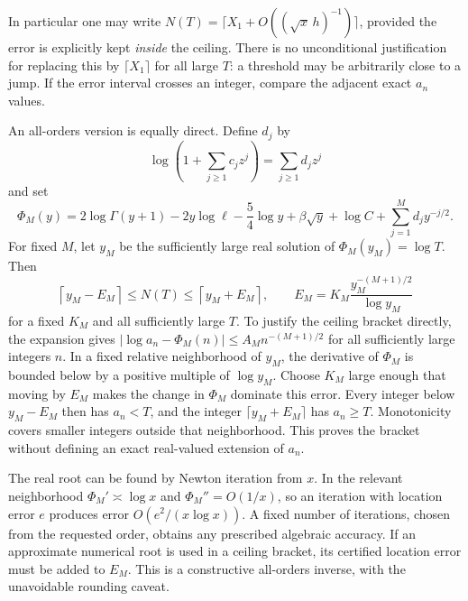 \documentclass[11pt]{article}
\theoremstyle{remark}\newtheorem{remark}{Remark}
\begin{document}
In particular one may write $N(T)=\lceil X_1+O((\sqrt x\,h)^{-1})\rceil$, provided the error is explicitly kept \emph{inside} the ceiling. There is no unconditional justification for replacing this by $\lceil X_1\rceil$ for all large $T$: a threshold may be arbitrarily close to a jump. If the error interval crosses an integer, compare the adjacent exact $a_n$ values.

An all-orders version is equally direct. Define $d_j$ by
\[
 \log\left(1+\sum_{j\geq1}c_jz^j\right)=\sum_{j\geq1}d_jz^j
\]
and set
\[
 \Phi_M(y)=2\log\Gamma(y+1)-2y\log\ell-\frac54\log y
       +\beta\sqrt y+\log C+\sum_{j=1}^M d_jy^{-j/2}.
\]
For fixed $M$, let $y_M$ be the sufficiently large real solution of
$\Phi_M(y_M)=\log T$. Then
\[
 \left\lceil y_M-E_M\right\rceil\leq N(T)\leq\left\lceil y_M+E_M\right\rceil,
 \qquad E_M=K_M\frac{y_M^{-(M+1)/2}}{\log y_M}
\]
for a fixed $K_M$ and all sufficiently large $T$.
To justify the ceiling bracket directly, the expansion gives
$|\log a_n-\Phi_M(n)|\leq A_M n^{-(M+1)/2}$ for all sufficiently large integers $n$. In a fixed relative neighborhood of $y_M$, the derivative of $\Phi_M$ is bounded below by a positive multiple of $\log y_M$. Choose $K_M$ large enough that moving by $E_M$ makes the change in $\Phi_M$ dominate this error. Every integer below $y_M-E_M$ then has $a_n<T$, and the integer $\lceil y_M+E_M\rceil$ has $a_n\geq T$. Monotonicity covers smaller integers outside that neighborhood. This proves the bracket without defining an exact real-valued extension of $a_n$.

The real root can be found by Newton iteration from $x$. In the relevant neighborhood $\Phi_M'\asymp\log x$ and $\Phi_M''=O(1/x)$, so an iteration with location error $e$ produces error $O(e^2/(x\log x))$. A fixed number of iterations, chosen from the requested order, obtains any prescribed algebraic accuracy. If an approximate numerical root is used in a ceiling bracket, its certified location error must be added to $E_M$. This is a constructive all-orders inverse, with the unavoidable rounding caveat.
\end{document}
